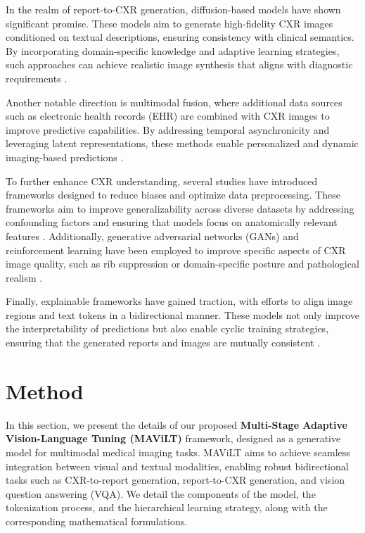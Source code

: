 In the realm of report-to-CXR generation, diffusion-based models have shown significant promise. These models aim to generate high-fidelity CXR images conditioned on textual descriptions, ensuring consistency with clinical semantics. By incorporating domain-specific knowledge and adaptive learning strategies, such approaches can achieve realistic image synthesis that aligns with diagnostic requirements \cite{huang2024diffcxr, han2024advancing}.

Another notable direction is multimodal fusion, where additional data sources such as electronic health records (EHR) are combined with CXR images to improve predictive capabilities. By addressing temporal asynchronicity and leveraging latent representations, these methods enable personalized and dynamic imaging-based predictions \cite{yao2024addressing}.

To further enhance CXR understanding, several studies have introduced frameworks designed to reduce biases and optimize data preprocessing. These frameworks aim to improve generalizability across diverse datasets by addressing confounding factors and ensuring that models focus on anatomically relevant features \cite{aslani2022optimising, castro2024padchestgr}. Additionally, generative adversarial networks (GANs) and reinforcement learning have been employed to improve specific aspects of CXR image quality, such as rib suppression or domain-specific posture and pathological realism \cite{han2021ganbased, chen2023finematching}.

Finally, explainable frameworks have gained traction, with efforts to align image regions and text tokens in a bidirectional manner. These models not only improve the interpretability of predictions but also enable cyclic training strategies, ensuring that the generated reports and images are mutually consistent \cite{chen2023finematching}.







\section{Method}

In this section, we present the details of our proposed \textbf{Multi-Stage Adaptive Vision-Language Tuning (MAViLT)} framework, designed as a generative model for multimodal medical imaging tasks. MAViLT aims to achieve seamless integration between visual and textual modalities, enabling robust bidirectional tasks such as CXR-to-report generation, report-to-CXR generation, and vision question answering (VQA). We detail the components of the model, the tokenization process, and the hierarchical learning strategy, along with the corresponding mathematical formulations.

